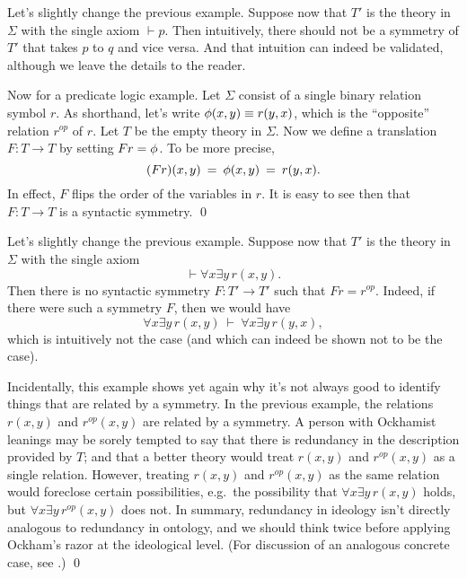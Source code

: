 \begin{example} Let's slightly change the previous example.  Suppose
  now that $T'$ is the theory in $\Sigma$ with the single axiom
  $\vdash p$.  Then intuitively, there should not be a symmetry of
  $T'$ that takes $p$ to $q$ and vice versa.  And that intuition can
  indeed be validated, although we leave the details to the
  reader.
\end{example}

\begin{example} Now for a predicate logic example.  Let $\Sigma$
  consist of a single binary relation symbol $r$.  As shorthand, let's
  write $\phi (x,y)\equiv r(y,x)$, which is the ``opposite'' relation
  $r^{op}$ of $r$.  Let $T$ be the empty theory in $\Sigma$.  Now we
  define a translation $F:T\to T$ by setting $Fr=\phi$.  To be more
  precise,
  \[ (Fr)(x,y) \: = \: \phi (x,y) \: = \: r(y,x) .\] In effect, $F$
  flips the order of the variables in $r$.  It is easy to see then
  that $F:T\to T$ is a syntactic symmetry. \hfill \qed
\end{example}

\begin{example} Let's slightly change the previous example.  Suppose
  now that $T'$ is the theory in $\Sigma$ with the single axiom
  \[ \vdash \forall x\exists y\,r(x,y) .\] Then there is no syntactic
  symmetry $F:T'\to T'$ such that $Fr=r^{op}$.  Indeed, if there were
  such a symmetry $F$, then we would have
  \[ \forall x\exists y\,r(x,y) \: \vdash \: \forall x\exists y\,r(y,x)
    , \] which is intuitively not the case (and which can indeed be
  shown not to be the case).

  Incidentally, this example shows yet again why it's not always good
  to identify things that are related by a symmetry.  In the previous
  example, the relations $r(x,y)$ and $r^{op}(x,y)$ are related by a
  symmetry.  A person with Ockhamist leanings may be sorely tempted to
  say that there is redundancy in the description provided by $T$; and
  that a better theory would treat $r(x,y)$ and $r^{op}(x,y)$ as a
  single relation.  However, treating $r(x,y)$ and $r^{op}(x,y)$ as
  the same relation would foreclose certain possibilities, e.g.\ the
  possibility that $\forall x\exists y\, r(x,y)$ holds, but
  $\forall x\exists y\, r^{op}(x,y)$ does not.  In summary, redundancy
  in ideology isn't directly analogous to redundancy in ontology, and
  we should think twice before applying Ockham's razor at the
  ideological level.  (For discussion of an analogous concrete case,
  see \cite{belot-ab}.)  \hfill \qed \end{example}
  

